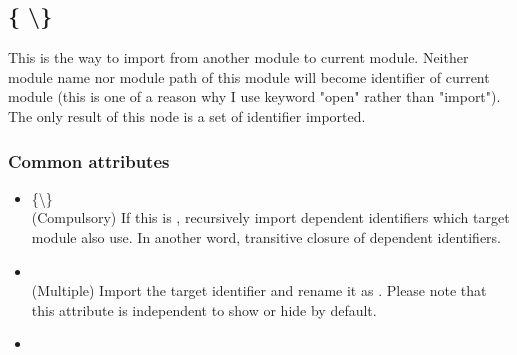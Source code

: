\documentclass[master.tex]{subfiles}
\begin{document}
\subsection{\kOpen {} \{ \kShowByDefault \textbackslash \kHideByDefault \} }

This is the way to import  from another module to current module. Neither module name nor module path of this module will become identifier of current module (this is one of a reason why I use keyword "open" rather than "import"). The only result of this node is a set of identifier imported.

\subsubsection{Common attributes}

\begin{itemize}
    \item \kRecursive \{\kTrue \textbackslash \kFalse\} \\
    (Compulsory) If this is \kTrue, recursively import dependent identifiers which target module also use. In another word, transitive closure of dependent identifiers.
    \item \kRename {} \kTo {} \\
    (Multiple) Import the target identifier and rename it as . Please note that this attribute is independent to show or hide by default.
    \item \kInject {} \kTo {} \\
\end{itemize}
\end{document}
